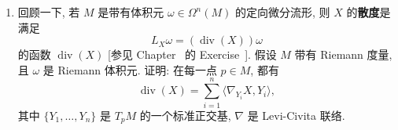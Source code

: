 \begin{enumerate}[label=(\arabic*),ref=\arabic*,leftmargin=*]
\item\label{ex:riemannian-divergence-trace}
回顾一下, 若 $M$ 是带有体积元 $\omega\in\Omega^n(M)$ 的定向微分流形, 则 $X$ 的\textbf{散度}是满足
\[
  L_X\omega=(\operatorname{div}(X))\omega
\]
的函数 $\operatorname{div}(X)$ [参见 Chapter~ 的 Exercise~]. 假设 $M$ 带有 Riemann 度量, 且 $\omega$ 是 Riemann 体积元. 证明: 在每一点 $p\in M$, 都有
\[
  \operatorname{div}(X)=\sum_{i=1}^n\langle\nabla_{Y_i}X,Y_i\rangle,
\]
其中 $\{Y_1,\ldots,Y_n\}$ 是 $T_pM$ 的一个标准正交基, $\nabla$ 是 Levi-Civita 联络.
\end{enumerate}
